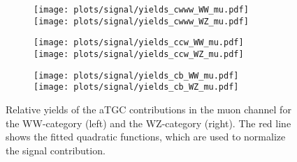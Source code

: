 \begin{figure}
	\centering
	\begin{subfigure}{\textwidth}
		\texttt{[image: plots/signal/yields\_cwww\_WW\_mu.pdf]}
		\texttt{[image: plots/signal/yields\_cwww\_WZ\_mu.pdf]}
	\end{subfigure}
	\begin{subfigure}{\textwidth}
		\texttt{[image: plots/signal/yields\_ccw\_WW\_mu.pdf]}
		\texttt{[image: plots/signal/yields\_ccw\_WZ\_mu.pdf]}
	\end{subfigure}
	\begin{subfigure}{\textwidth}
		\texttt{[image: plots/signal/yields\_cb\_WW\_mu.pdf]}
		\texttt{[image: plots/signal/yields\_cb\_WZ\_mu.pdf]}
	\end{subfigure}
	\caption[Relative yields of the aTGC contributions in the muon channel]{Relative yields of the aTGC contributions in the muon channel for the WW-category (left) and the WZ-category (right). The red line shows the fitted quadratic functions, which are used to normalize the signal contribution.}
	\label{fig:signal:atgcyields_mu}
\end{figure}

